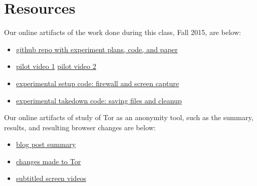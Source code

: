 \documentclass{template}
\begin{document}
\section{Resources}
\noindent Our online artifacts of the work done during this class, Fall 2015,
are below: 
\begin{itemize} \itemsep1pt \parskip0pt 
\item \href{https://github.com/lindanlee/circumvention-ux-tor}{github repo with experiment plans, code, and paper}
\item \href {https://github.com/lindanlee/circumvention-ux-tor/blob/master/pilot/1-strict.mp4}{pilot video 1}
	\href{https://github.com/lindanlee/circumvention-ux-tor/blob/master/pilot/2-lax.mp4}{pilot video 2}
\item \href{https://github.com/lindanlee/circumvention-ux-tor/blob/master/setup/setup-environment}{experimental setup code: firewall and screen capture} 
\item \href{https://github.com/lindanlee/circumvention-ux-tor/blob/master/setup/takedown-environment}{experimental takedown code: saving files and cleanup} 
\end{itemize}

Our online artifacts of study of Tor as an anonymity tool, such as 
the summary, results, and resulting browser changes are below:
\begin{itemize} \itemsep1pt \parskip0pt 
\item \href{https://trac.torproject.org/projects/tor/wiki/org/meetings/2015UXsprint}{blog post summary}
\item \href{https://blog.torproject.org/blog/ux-sprint-2015-wrapup}{changes made to Tor}
\item \href{https://people.torproject.org/~dcf/uxsprint2015/}{subtitled screen videos}
\end{itemize}


 
\end{document}
